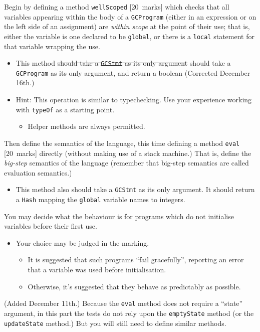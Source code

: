\documentclass[11pt]{article}
\theoremstyle{definition}
\begin{document}
Begin by defining a method \texttt{wellScoped} [20 marks] which checks that
all variables appearing within the body of a \texttt{GCProgram}
(either in an expression or on the left side of an assignment)
are \emph{within scope} at the point of their use;
that is, either the variable is one declared to be \texttt{global},
or there is a \texttt{local} statement for that variable wrapping the use.
\begin{itemize}
\item This method
\sout{should take a \texttt{GCStmt} as its only argument}
should take a \texttt{GCProgram} as its only argument,
and return a boolean (Corrected December 16th.)
\item Hint: This operation is similar to typechecking.
Use your experience working with \texttt{typeOf} as a starting point.
\begin{itemize}
\item Helper methods are always permitted.
\end{itemize}
\end{itemize}

Then define the semantics of the language,
this time defining a method \texttt{eval} [20 marks] directly
(without making use of a stack machine.)
That is, define the \emph{big-step} semantics of the language
(remember that big-step semantics are called evaluation semantics.)
\begin{itemize}
\item This method also should take a \texttt{GCStmt} as its only argument.
It should return a \texttt{Hash} mapping the \texttt{global} variable names
to integers.
\end{itemize}

You may decide what the behaviour is for programs which
do not initialise variables before their first use.
\begin{itemize}
\item Your choice may be judged in the marking.
\begin{itemize}
\item It is suggested that such programs “fail gracefully”,
reporting an error that a variable was used before initialisation.
\item Otherwise, it's suggested that they behave as predictably as possible.
\end{itemize}
\end{itemize}

(Added December 11th.)
Because the \texttt{eval} method does not require a “state” argument,
in this part the tests do not rely upon the \texttt{emptyState} method
(or the \texttt{updateState} method.) But you will still need
to define similar methods.
\end{document}
